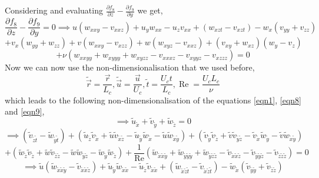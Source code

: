 \documentclass{article}
\begin{document}
Considering and evaluating $\frac{\partial f_8}{\partial z} - \frac{\partial f_9}{\partial y}$ we get,
\begin{equation*}
\frac{\partial f_8}{\partial z} - \frac{\partial f_9}{\partial y} = 0 \implies u(w_{xxy}-v_{xxz}) + u_y w_{xx} - u_z v_{xx} + (w_{xzt}-v_{xzt}) - w_x(v_{yy}+v_{zz})
\end{equation*}
\begin{equation*}
+ v_x(w_{yy}+w_{zz}) + v(w_{xxy}-v_{xzz}) + w(w_{xyz}-v_{xxz}) + (v_{xy}+w_{xz})(w_y-v_z)
\end{equation*}
\begin{equation} \label{eqn9}
+ \nu (w_{xxyy}+w_{xyyy}+w_{xyzz}-v_{xxxz}-v_{xyyz}-v_{xzzz}) = 0
\end{equation}
Now we can now use the non-dimensionalisation that we used before,
\begin{equation*}
\tilde{\vec{r}} = \frac{\vec{r}}{L_c}, \tilde{\vec{u}} = \frac{\vec{u}}{U_c}, \tilde{t} = \frac{U_c t}{L_c}, \operatorname{Re} = \frac{U_c L_c}{\nu}
\end{equation*}
which leads to the following non-dimensionalisation of the equations \ref{eqn1}, \ref{eqn8} and \ref{eqn9},
\begin{equation*}
\implies \tilde{u}_{\tilde{x}} + \tilde{v}_{\tilde{y}} + \tilde{w}_{\tilde{z}} = 0
\end{equation*}
\begin{equation*}
\implies (\tilde{v}_{\tilde{z}\tilde{t}}-\tilde{w}_{\tilde{y}\tilde{t}})+(\tilde{u}_{\tilde{z}} \tilde{v}_{\tilde{x}} + \tilde{u} \tilde{v}_{\tilde{x}\tilde{z}} - \tilde{u}_{\tilde{y}} \tilde{w}_{\tilde{x}} - \tilde{u} \tilde{w}_{\tilde{x}\tilde{y}})+(\tilde{v}_{\tilde{y}} \tilde{v}_{\tilde{z}} + \tilde{v} \tilde{v}_{\tilde{y}\tilde{z}} - \tilde{v}_{\tilde{x}} \tilde{w}_{\tilde{y}} - \tilde{v} \tilde{w}_{\tilde{x}\tilde{y}})
\end{equation*}
\begin{equation*}
+(\tilde{w}_{\tilde{z}} \tilde{v}_{\tilde{z}} + \tilde{w} \tilde{v}_{\tilde{z}\tilde{z}} - \tilde{w} \tilde{w}_{\tilde{y}\tilde{z}} - \tilde{w}_{\tilde{y}} \tilde{w}_{\tilde{z}}) + \frac{1}{\operatorname{Re}} (\tilde{w}_{\tilde{x}\tilde{x}\tilde{y}}+\tilde{w}_{\tilde{y}\tilde{y}\tilde{y}}+\tilde{w}_{\tilde{y}\tilde{z}\tilde{z}}-\tilde{v}_{\tilde{x}\tilde{x}\tilde{z}}-\tilde{v}_{\tilde{y}\tilde{y}\tilde{z}}-\tilde{v}_{\tilde{z}\tilde{z}\tilde{z}})= 0 
\end{equation*}
\begin{equation*}
\implies \tilde{u}(\tilde{w}_{\tilde{x}\tilde{x}\tilde{y}}-\tilde{v}_{\tilde{x}\tilde{x}\tilde{z}}) + \tilde{u}_{\tilde{y}} \tilde{w}_{\tilde{x}\tilde{x}} - \tilde{u}_{\tilde{z}} \tilde{v}_{\tilde{x}\tilde{x}} + (\tilde{w}_{\tilde{x}\tilde{z}\tilde{t}}-\tilde{v}_{\tilde{x}\tilde{z}\tilde{t}}) - \tilde{w}_{\tilde{x}}(\tilde{v}_{\tilde{y}\tilde{y}}+\tilde{v}_{\tilde{z}\tilde{z}})
\end{equation*}
\end{document}
